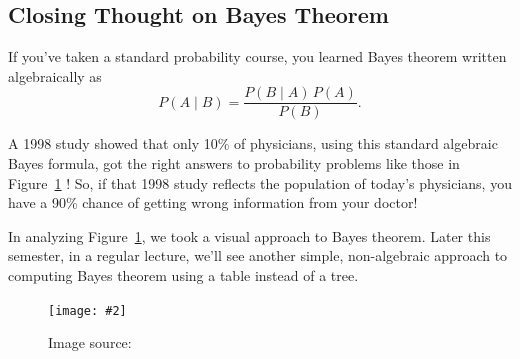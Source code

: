 \documentclass[12pt]{tufte-handout}
\newcommand{\ig}[2]{\texttt{[image: \#2]}}  %
\newcommand{\igw}[2]{\ig{width=#1\textwidth}{#2}}   %
\begin{document}
\subsection{Closing Thought on Bayes Theorem}
\label{sec:clos-thoughts-bayes}

If you've taken a standard probability course, you learned Bayes theorem written algebraically as
\[
P(A \mid B) = \frac{P(B \mid A)\,P(A)}{P(B)}.
\]

A 1998     study showed that only 10\% of physicians, using this standard algebraic Bayes formula, got the right answers to probability problems like those in Figure~\ref{fig:Spiegelhalter2011a} \citep{Gigerenzer1995a,Hoffrage1998}!  So, if that 1998 study reflects the population of today's physicians, you have a 90\% chance of getting wrong information from your doctor!

In analyzing Figure~\ref{fig:Spiegelhalter2011a}, we took a visual approach to Bayes theorem.  
Later this semester, in a regular lecture, we'll see another simple, non-algebraic approach to computing Bayes theorem using a table instead of a tree.


\begin{figure}
\centering
\igw{0.9}{Spiegelhalter2011a_fig4.jpg}
\caption{Image source: \citep{Spiegelhalter2011a}}
\label{fig:Spiegelhalter2011a}

\end{figure}



\end{document}
